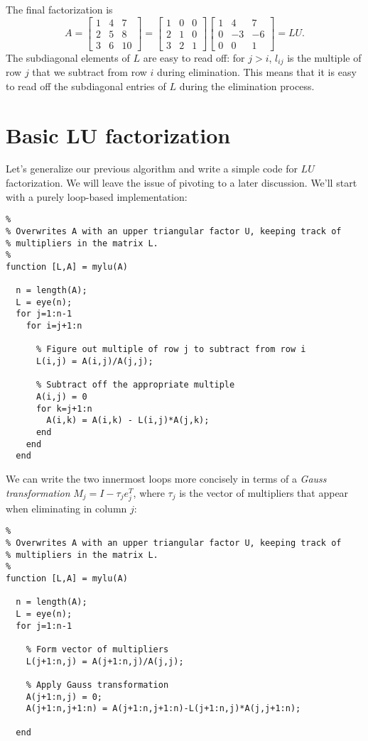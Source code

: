 \documentclass[12pt, leqno]{article}
\begin{document}
The final factorization is
\[
A =
\begin{bmatrix} 1 & 4 & 7 \\ 2 & 5 & 8 \\ 3 & 6 & 10 \end{bmatrix} =
\begin{bmatrix} 1 & 0 & 0 \\ 2 & 1 & 0 \\ 3 & 2 & 1 \end{bmatrix}
\begin{bmatrix} 1 & 4 & 7 \\ 0 & -3 & -6 \\ 0 & 0 & 1 \end{bmatrix} = LU.
\]
The subdiagonal elements of $L$ are easy to read off: for $j
> i$, $l_{ij}$ is the multiple of row $j$ that we subtract from row
$i$ during elimination.  This means that it is easy to read off the
subdiagonal entries of $L$ during the elimination process.

\section{Basic LU factorization}

Let's generalize our previous algorithm and write a simple code for
$LU$ factorization.  We will leave the issue of pivoting to a later
discussion.  We'll start with a purely loop-based implementation:
\begin{lstlisting}
%
% Overwrites A with an upper triangular factor U, keeping track of
% multipliers in the matrix L.
%
function [L,A] = mylu(A)

  n = length(A);
  L = eye(n);
  for j=1:n-1
    for i=j+1:n

      % Figure out multiple of row j to subtract from row i
      L(i,j) = A(i,j)/A(j,j);

      % Subtract off the appropriate multiple
      A(i,j) = 0
      for k=j+1:n
        A(i,k) = A(i,k) - L(i,j)*A(j,k);
      end
    end
  end
\end{lstlisting}
We can write the two innermost loops more concisely in
terms of a {\em Gauss transformation} $M_j = I - \tau_j e_j^T$,
where $\tau_j$ is the vector of multipliers that appear when
eliminating in column $j$:
\begin{lstlisting}
%
% Overwrites A with an upper triangular factor U, keeping track of
% multipliers in the matrix L.
%
function [L,A] = mylu(A)

  n = length(A);
  L = eye(n);
  for j=1:n-1

    % Form vector of multipliers
    L(j+1:n,j) = A(j+1:n,j)/A(j,j);

    % Apply Gauss transformation
    A(j+1:n,j) = 0;
    A(j+1:n,j+1:n) = A(j+1:n,j+1:n)-L(j+1:n,j)*A(j,j+1:n);

  end
\end{lstlisting}
\end{document}
